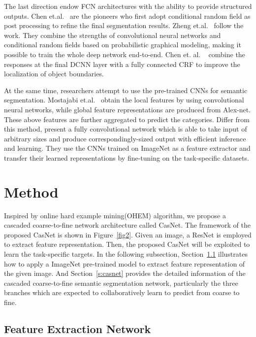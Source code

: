 \documentclass[10.5pt,compsoc]{TsT}
\newcommand{\upcite}[1]{\superscript{\textsuperscript{\cite{#1}}}}
\theoremstyle{mystyle}
\newcommand{\upcite}[1]{\textsuperscript{\cite{#1}}}
\begin{document}
{The last direction endow FCN architectures with the ability to provide structured outputs. 
Chen et.al.~\upcite{31} are the pioneers who first adopt conditional random field  as post processing to refine the final segmentation results. Zheng et.al.~\upcite{32} follow the work. They combine
the strengths of convolutional neural networks and conditional random fields based on probabilistic graphical modeling, making it possible to train the whole deep network end-to-end. Chen et. al. ~\cite{35} combine the responses at the final DCNN layer with a fully connected CRF to improve the localization of object boundaries.

At the same time, researchers attempt to use the pre-trained CNNs for semantic segmentation. Mostajabi et.al.~\upcite{17} obtain the local features by using convolutional neural networks, while  global feature representations are produced from Alex-net. These above features are further aggregated to predict the categories. Differ from this method, \cite{19} present a fully convolutional network which is able to take input of arbitrary sizes and produce correspondingly-sized output with efficient inference and learning. They use the CNNs trained on ImageNet as a feature extractor and transfer their learned representations by fine-tuning on the task-specific datasets.

\section{Method}
\label{s:Method}
\noindent


Inspired by online hard example mining(OHEM) algorithm, we propose a cascaded coarse-to-fine network architecture called CasNet. The framework of the proposed CasNet is shown in Figure~\ref{fig2}. Given an image, a ResNet is employed to extract feature representation. Then, the proposed CasNet will be exploited to learn the task-specific targets. In the following subsection, Section~\ref{s:feature} illustrates how to apply a ImageNet pre-trained model to extract feature representation of the given image. And Section~\ref{s:casnet} provides the detailed information of the cascaded coarse-to-fine semantic segmentation network, particularly the three branches which are expected to collaboratively learn to predict from coarse to fine.


\subsection{Feature Extraction Network}
\label{s:feature}
\noindent

}
\end{document}
